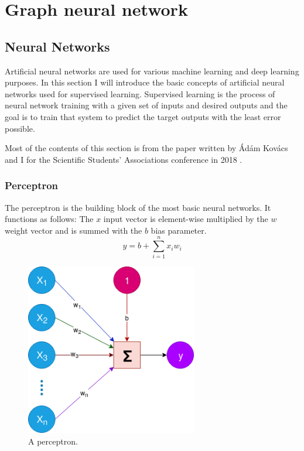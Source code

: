 \chapter{Graph neural network}\label{sect:GraphNetwork}

\section{Neural Networks}
Artificial neural networks are used for various machine learning and deep learning purposes. In this section I will introduce the basic concepts of artificial neural networks used for supervised learning. Supervised learning is the process of neural network training with a given set of inputs and desired outputs and the goal is to train that system to predict the target outputs with the least error possible.

Most of the contents of this section is from the paper written by \'Ad\'am Kov\'acs and I for the Scientific Students' Associations conference in 2018 \cite{SemParse}.

\subsection{Perceptron}
The perceptron is the building block of the most basic neural networks. It functions as follows: The \(x\) input vector is element-wise multiplied by the \(w\) weight vector and is summed with the \(b\) bias parameter.
\[y = b + \sum_{i=1}^{n} x_i w_i\]

\begin{figure}[!ht]
	\centering
	\includegraphics[width=75mm, keepaspectratio]{figures/perceptron.png}
	\caption{A perceptron.}
	\label{fig:perceptron}
\end{figure}

